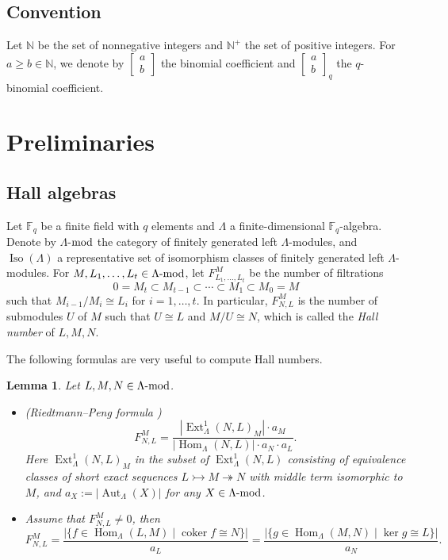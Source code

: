\documentclass[12pt]{amsart}
\newtheorem{lemma}[theorem]{Lemma}
\theoremstyle{remark}
\theoremstyle{definition}
\numberwithin{equation}{section}
\newcommand{\Hom}{\operatorname{Hom}\nolimits}
\newcommand{\Ext}{\operatorname{Ext}\nolimits}
\newcommand{\opname}{\operatorname}
\newcommand{\sqbinom}[2]{\begin{bmatrix} #1 \\ #2 \end{bmatrix}}
\begin{document}
\subsection*{Convention} Let $\mathbb{N}$ be the set of nonnegative integers and $\mathbb{N}^+$ the set of positive integers. For $a\geq b\in \mathbb{N}$, we denote by $\sqbinom{a}{b}$ the binomial coefficient and $\sqbinom{a}{b}_q$ the $q$-binomial coefficient. 




\section{Preliminaries}\label{s:preliminary}
\subsection{Hall algebras}
Let $\mathbb{F}_q$ be a finite field with $q$ elements and $\Lambda$ a finite-dimensional $\mathbb{F}_q$-algebra. Denote by $\Lambda$-${\rm mod}$ the category of finitely generated left $\Lambda$-modules, and $\opname{Iso}(\Lambda)$ a representative set of isomorphism classes of finitely generated left $\Lambda$-modules. For $M, L_1, \ldots, L_t\in \Lambda{\text{-{\rm mod}}}$, let $F_{L_1,\ldots,L_t}^M$ be the number of filtrations
\[
0=M_t\subset M_{t-1}\subset\cdots\subset M_1\subset M_0=M
\]
such that $M_{i-1}/M_i\cong L_i$ for $i=1,\ldots,t$. In particular, $F_{N,L}^M$ is the number of submodules $U$ of $M$ such that $U\cong L$ and $M/U\cong N$, which is called the {\em Hall number} of  $L,M,N$.

The following  formulas are very useful to compute Hall numbers.
\begin{lemma}\label{lem:hall-number-computation-k}
Let $L,M,N \in \Lambda\text{-{\rm mod}}$.

\begin{itemize}
    \item[(1)](Riedtmann--Peng formula \cite[Lemma 3.1]{P97}) \[
F^{M}_{N,L}
=
\frac{\left| \Ext^1_\Lambda(N,L)_M \right| \cdot a_M}
{\left| \Hom_\Lambda(N,L) \right| \cdot a_N \cdot a_L}.
\]Here $\Ext^1_\Lambda(N,L)_M$ 
in the subset  of $\Ext^1_\Lambda(N,L)$ consisting of 
equivalence classes of short exact sequences
$L \rightarrowtail M \twoheadrightarrow N$
with middle term isomorphic to $M$, and
$ a_X := \left| \operatorname{Aut}_\Lambda(X) \right|$ for any $X\in \Lambda\text{-{\rm mod}}$.
\item[(2)] Assume that $F_{N,L}^M\neq 0$, then
\[F_{N,L}^M=\frac{|\{f\in \Hom_{\Lambda}(L,M)\mid \operatorname{coker}f\cong N\}|}{a_L}=
  \frac{|\{g\in \Hom_{\Lambda}(M,N)\mid \operatorname{ker}g\cong L\}|}{a_N}.
   \]

\end{itemize}


\end{lemma}
\end{document}
